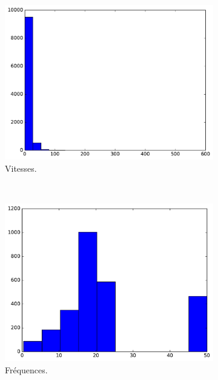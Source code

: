 	\begin{figure}[htb]		
		\begin{subfigure}[t]{\subImgWclicks}
			\centering
			\includegraphics[width=\textwidth]{figures/ch3/bille_speed}
			\caption{Vitesses.}
			\label{fig:bille_speed}
		\end{subfigure}
		~
		\begin{subfigure}[t]{\subImgWclicks}
			\centering
			\includegraphics[width=\textwidth]{figures/ch3/bille_frequency}
			\caption{Fréquences.}
			\label{fig:bille_frequency}
		\end{subfigure}
		~
		\begin{subfigure}[t]{\subImgWclicks}
			\centering

\end{subfigure}
\end{figure}
